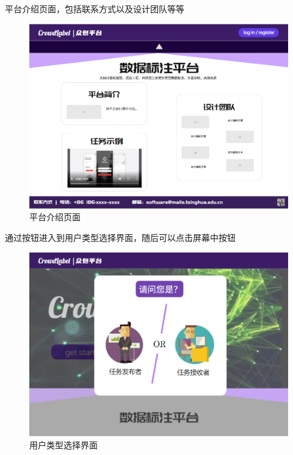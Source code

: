 \newpage

平台介绍页面，包括联系方式以及设计团队等等

\begin{figure}[h!]
    \centering
    \includegraphics[width=\linewidth]{imgs/prototype/description.png}
    \caption{平台介绍页面}
    \label{fig:proto_description}
\end{figure}

\newpage

通过按钮进入到用户类型选择界面，随后可以点击屏幕中按钮

\begin{figure}[h!]
    \centering
    \includegraphics[width=\linewidth]{imgs/prototype/profile.png}
    \caption{用户类型选择界面}
    \label{fig:proto_profile}
\end{figure}

